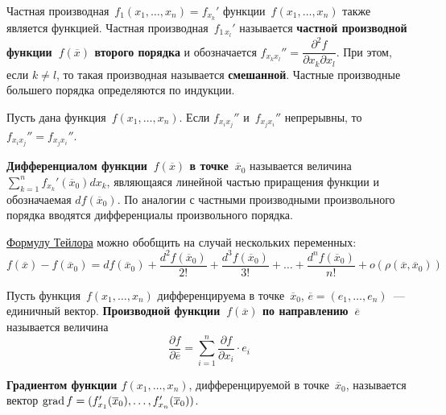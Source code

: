 Частная производная~$f_1(x_1, \ldots, x_n) = f_{x_k}'$ функции~$f(x_1, \ldots, x_n)$ также является функцией.
Частная производная~$f_{1\, x_l}'$ называется \textbf{частной производной функции~$f(\overline x)$ второго порядка} и обозначается $f_{x_k x_l}'' = \dfrac{\partial^2 f}{\partial x_k \partial x_l}$.
При этом, если $k \neq l$, то такая производная называется \textbf{смешанной}.
Частные производные большего порядка определяются по индукции.

\begin{theorem}[Шварца]
Пусть дана функция~$f(x_1, \ldots, x_n)$.
Если $f_{x_i x_j}''$ и~$f_{x_j x_i}''$ непрерывны, то $f_{x_i x_j}'' = f_{x_j x_i}''$.
\end{theorem}

\textbf{Дифференциалом функции~$f(\overline x)$ в точке~$\overline x_0$} называется величина $\displaystyle \sum_{k=1}^n f_{x_k}'(\overline x_0) dx_k$, являющаяся линейной частью приращения функции и обозначаемая $df(\overline x_0)$.
По аналогии с частными производными произвольного порядка вводятся дифференциалы произвольного порядка.

\hyperref[eq:Taylor_series]{Формулу Тейлора} можно обобщить на случай нескольких переменных:
\begin{equation}
\label{eq:Taylor_series_for_several_variables}
f(\overline x) - f(\overline x_0) =
df(\overline x_0) + \frac{d^2 f(\overline x_0)}{2!} + \frac{d^3 f(\overline x_0)}{3!} + \ldots + \frac{d^n f(\overline x_0)}{n!} + o(\rho(\overline x, \overline x_0))
\end{equation}

 Пусть функция~$f(x_1, \ldots, x_n)$ дифференцируема в точке~$\overline x_0$, $\overline e = (e_1, \ldots, e_n)$~--- единичный вектор.
\textbf{Производной функции~$f(\overline x)$ по направлению~$\overline e$} называется величина
\begin{equation*}
\frac{\partial f}{\partial \overline e} = \sum_{i=1}^n \frac{\partial f}{\partial x_i} \cdot e_i
\end{equation*}

  \textbf{Градиентом функции $f(x_1, \ldots, x_n)$}, дифференцируемой в точке~$\overline x_0$, называется вектор $\operatorname{grad} f = (f_{x_1}'(\overline x_0), \ldots, \allowbreak f_{x_n}'(\overline x_0))$.